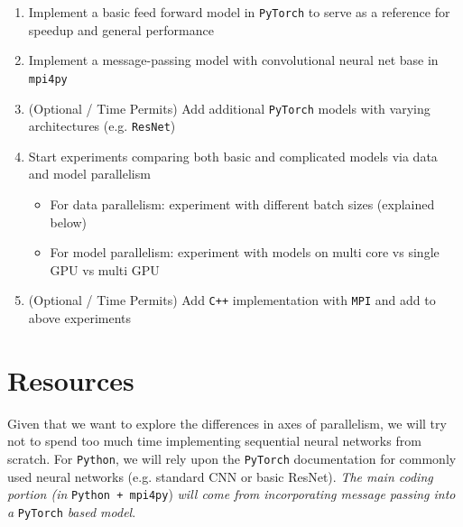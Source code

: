 \documentclass{article}
\begin{document}
\begin{enumerate}
  \item Implement a basic feed forward model in \texttt{PyTorch} to serve as a reference for speedup and general performance
  \item Implement a message-passing model with convolutional neural net base in \texttt{mpi4py}
  \item (Optional / Time Permits) Add additional \texttt{PyTorch} models with varying architectures (e.g. \texttt{ResNet})
  \item Start experiments comparing both basic and complicated models via data and model parallelism
  \begin{itemize}
    \item For data parallelism: experiment with different batch sizes (explained below)
    \item For model parallelism: experiment with models on multi core vs single GPU vs multi GPU
  \end{itemize}
  \item (Optional / Time Permits) Add \texttt{C++} implementation with \texttt{MPI} and add to above experiments
\end{enumerate}

\section*{Resources}


Given that we want to explore the differences in axes of parallelism, we will try not to spend too much time implementing sequential neural networks from scratch. For \texttt{Python}, we will rely upon the \texttt{PyTorch} documentation for commonly used neural networks (e.g. standard CNN or basic ResNet). \textit{The main coding portion (in} \texttt{Python + mpi4py}) \textit{will come from incorporating message passing into a} \texttt{PyTorch} \textit{based model}. \\
\end{document}
